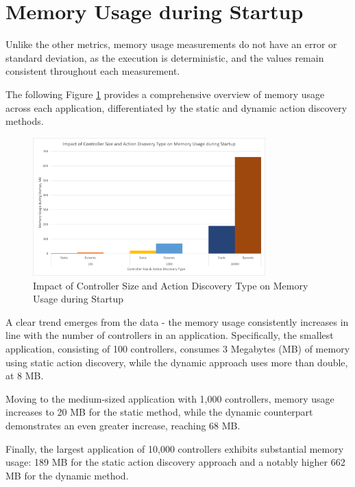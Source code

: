 \section{Memory Usage during Startup}

Unlike the other metrics, memory usage measurements do not have an error or standard deviation, as the execution is deterministic, and the values remain consistent throughout each measurement.

The following Figure \ref{fig:memory-usage-results} provides a comprehensive overview of memory usage across each application, differentiated by the static and dynamic action discovery methods.

\begin{figure}[H]
\centering
\includegraphics[width=0.8\textwidth]{graphics/Impact of Controller Size and Action Discovery Type on Memory Usage during Startup.png}
\caption{Impact of Controller Size and Action Discovery Type on Memory Usage during Startup}
\label{fig:memory-usage-results}
\end{figure}

A clear trend emerges from the data - the memory usage consistently increases in line with the number of controllers in an application. Specifically, the smallest application, consisting of 100 controllers, consumes 3 Megabytes (MB) of memory using static action discovery, while the dynamic approach uses more than double, at 8 MB.

Moving to the medium-sized application with 1,000 controllers, memory usage increases to 20 MB for the static method, while the dynamic counterpart demonstrates an even greater increase, reaching 68 MB.

Finally, the largest application of 10,000 controllers exhibits substantial memory usage: 189 MB for the static action discovery approach and a notably higher 662 MB for the dynamic method.